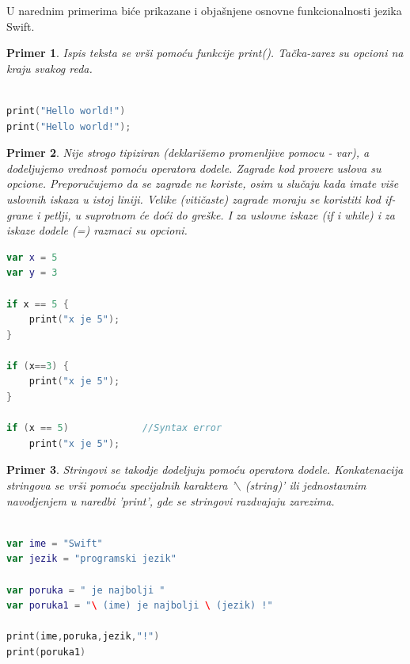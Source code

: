 \documentclass[a4paper]{article}
\newtheorem{primer}{Primer}[section]
\begin{document}
U narednim primerima biće prikazane i objašnjene osnovne funkcionalnosti jezika Swift.
\begin{primer}

Ispis teksta se vrši pomoću funkcije print(). Tačka-zarez su opcioni na kraju svakog reda.
\end{primer}

\begin{lstlisting}[language=Swift, caption={Ispis teksta},frame=single, label=simple]

print("Hello world!")
print("Hello world!");

\end{lstlisting}

\begin{primer}
Nije strogo tipiziran (deklarišemo promenljive pomocu - var), a dodeljujemo vrednost pomoću operatora dodele. Zagrade kod provere uslova su opcione. Preporučujemo da se zagrade ne koriste, osim u slučaju kada imate više uslovnih iskaza u istoj liniji.
Velike (vitičaste) zagrade moraju se koristiti kod if-grane i petlji, u suprotnom će doći do greške. I za uslovne iskaze (if i while) i za iskaze dodele (=) razmaci su opcioni.
\end{primer}
\begin{lstlisting}[language=Swift, caption={Dodeljivanje vrednosti i provera uslova},frame=single, label=simple]
var x = 5
var y = 3

if x == 5 {
	print("x je 5");
}

if (x==3) {
	print("x je 5");
}

if (x == 5)				//Syntax error
	print("x je 5");
\end{lstlisting}

\begin{primer}
Stringovi se takodje dodeljuju pomoću operatora dodele. Konkatenacija stringova se vrši pomoću specijalnih karaktera '$\backslash$ (string)' ili jednostavnim navodjenjem u naredbi 'print', gde se stringovi razdvajaju zarezima.
\end{primer}

\begin{lstlisting}[language=Swift, caption={Stringovi i konkatenacija stringova},frame=single, label=simple]

var ime = "Swift"
var jezik = "programski jezik"

var poruka = " je najbolji "
var poruka1 = "\ (ime) je najbolji \ (jezik) !" 

print(ime,poruka,jezik,"!")
print(poruka1)

\end{lstlisting}
\end{document}
